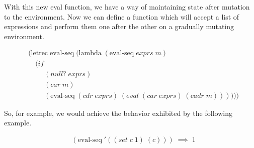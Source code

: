 With this new eval function, we have a way of maintaining state after 
mutation to the environment. Now we can define a function which will accept
a list of expressions and perform them one after the other on a gradually
mutating environment.

\begin{align*}
& (\text{letrec} \; \text{eval-seq} \; (\text{lambda} \; (\text{eval-seq} \; exprs \; m)
\\& \quad (if
\\& \qquad \; (null? \; exprs)
\\& \qquad \; (car \; m)
\\& \qquad \; (\text{eval-seq} \; (cdr \; exprs) \; (eval \; (car \; exprs) \; (cadr \; m))))))
\end{align*}

So, for example, we would achieve the behavior exhibited by the following
example.

\begin{align*}
& (\text{eval-seq} \; '((set \; c \; 1) \; (c))) \; \implies \; 1
\end{align*}
